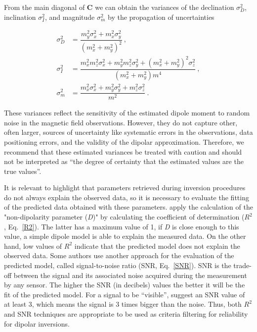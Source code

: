 From the main diagonal of $\mathbf{C}$ we can obtain the variances of the
declination $\sigma_D^2$, inclination $\sigma_I^2$, and magnitude $\sigma_m^2$
by the propagation of uncertainties

\begin{equation}
\begin{aligned}
\sigma_D^2 &= \dfrac{m_y^2\sigma_x^2 + m_x^2\sigma_y^2}{\left(m_x^2 + m_y^2\right)^2} \ , \\
\sigma_I^2 &= \dfrac{m_x^2 m_z^2 \sigma_x^2 + m_y^2 m_z^2 \sigma_y^2 + \left(m_x^2 + m_y^2\right)^2\sigma_z^2}{\left(m_x^2 + m_y^2\right) m^4} \ , \\
\sigma_m^2 &= \dfrac{m_x^2\sigma_x^2 + m_y^2\sigma_y^2 + m_z^2\sigma_z^2}{m^2} \ .
\end{aligned}
\end{equation}

\noindent
These variances reflect the sensitivity of the estimated dipole moment to random noise in the magnetic field observations. However, they do not capture other, often larger, sources of uncertainty like systematic errors in the observations, data positioning errors, and the validity of the dipolar approximation. Therefore, we recommend that these estimated variances be treated with caution and should not be interpreted as ``the degree of certainty that the estimated values are the true values''.

It is relevant to highlight that parameters retrieved during inversion procedures do not always explain the observed data, so it is necessary to evaluate the fitting of the predicted data obtained with these parameters. \cite{Fu2020} apply the calculation of the "non-dipolarity parameter (\emph{D})" by calculating the coefficient of determination ($R^2$, Eq.~\ref{R2}). The latter has a maximum value of 1, if \emph{D} is close enough to this value, a simple dipole model is able to explain the measured data. On the other hand, low values of $R^2$ indicate that the predicted model does not explain the observed data. Some authors \citep[e.g.,][]{Myre2019, CortesOrtuno2021, Lima2009} use another approach for the evaluation of the predicted model, called signal-to-noise ratio (SNR, Eq.~\ref{SNR}). SNR is the trade-off between the signal and its associated noise acquired during the measurement by any sensor. The higher the SNR (in decibels) values the better it will be the fit of the predicted model. For a signal to be “visible”,  \cite{Strum2014} suggest an SNR value of at least 3, which means the signal is 3 times bigger than the noise. Thus, both $R^2$ and SNR techniques are appropriate to be used as criteria filtering for reliability for dipolar inversions.

